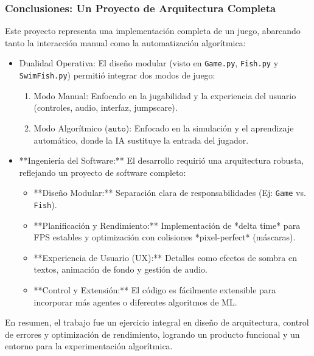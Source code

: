 \documentclass[
	11pt, %
]{beamer}
\begin{document}

\begin{frame} \frametitle{Conclusiones: Un Proyecto de Arquitectura Completa}

Este proyecto representa una implementación completa de un juego, abarcando tanto la interacción manual como la automatización algorítmica:

\begin{itemize}
\item Dualidad Operativa: El diseño modular (visto en \texttt{Game.py}, \texttt{Fish.py} y \texttt{SwimFish.py}) permitió integrar dos modos de juego:
\begin{enumerate}
\item Modo Manual: Enfocado en la jugabilidad y la experiencia del usuario (controles, audio, interfaz, jumpscare).
\item Modo Algorítmico ($\texttt{auto}$): Enfocado en la simulación y el aprendizaje automático, donde la IA sustituye la entrada del jugador.
\end{enumerate}

\item **Ingeniería del Software:** El desarrollo requirió una arquitectura robusta, reflejando un proyecto de software completo:
\begin{itemize}
    \item **Diseño Modular:** Separación clara de responsabilidades (Ej: \texttt{Game} vs. \texttt{Fish}).
    \item **Planificación y Rendimiento:** Implementación de *delta time* para FPS estables y optimización con colisiones *pixel-perfect* (máscaras).
    \item **Experiencia de Usuario (UX):** Detalles como efectos de sombra en textos, animación de fondo y gestión de audio.
    \item **Control y Extensión:** El código es fácilmente extensible para incorporar más agentes o diferentes algoritmos de ML.
\end{itemize}

\end{itemize}

\vspace{5pt} En resumen, el trabajo fue un ejercicio integral en diseño de arquitectura, control de errores y optimización de rendimiento, logrando un producto funcional y un entorno para la experimentación algorítmica.

\end{frame}
\end{document}
